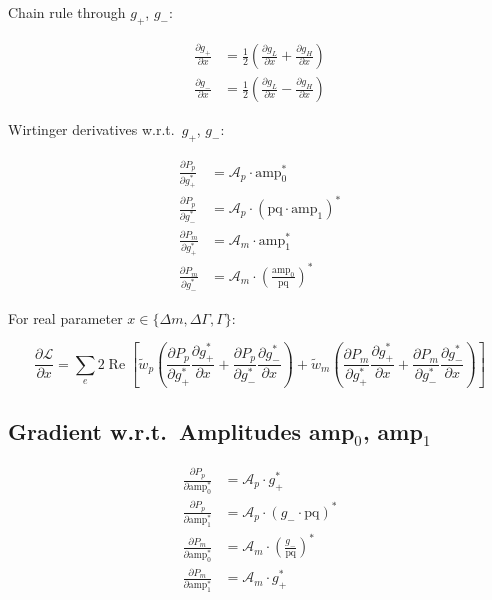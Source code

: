 \documentclass[12pt,a4paper]{article}
\begin{document}
Chain rule through $g_+$, $g_-$:

\begin{align}
\frac{\partial g_+}{\partial x} &= \frac{1}{2}\left(\frac{\partial g_L}{\partial x} + \frac{\partial g_H}{\partial x}\right) \\
\frac{\partial g_-}{\partial x} &= \frac{1}{2}\left(\frac{\partial g_L}{\partial x} - \frac{\partial g_H}{\partial x}\right)
\end{align}

Wirtinger derivatives w.r.t.\ $g_+$, $g_-$:

\begin{align}
\frac{\partial P_p}{\partial g_+^*} &= \mathcal{A}_p \cdot \text{amp}_0^* \\
\frac{\partial P_p}{\partial g_-^*} &= \mathcal{A}_p \cdot (\text{pq} \cdot \text{amp}_1)^* \\
\frac{\partial P_m}{\partial g_+^*} &= \mathcal{A}_m \cdot \text{amp}_1^* \\
\frac{\partial P_m}{\partial g_-^*} &= \mathcal{A}_m \cdot \left(\frac{\text{amp}_0}{\text{pq}}\right)^*
\end{align}

For real parameter $x \in \{\Delta m, \Delta\Gamma, \Gamma\}$:

\begin{equation}
\frac{\partial \mathcal{L}}{\partial x} = \sum_e 2\operatorname{Re}\!\left[
\tilde{w}_p \left(\frac{\partial P_p}{\partial g_+^*} \frac{\partial g_+^*}{\partial x} + \frac{\partial P_p}{\partial g_-^*} \frac{\partial g_-^*}{\partial x}\right)
+ \tilde{w}_m \left(\frac{\partial P_m}{\partial g_+^*} \frac{\partial g_+^*}{\partial x} + \frac{\partial P_m}{\partial g_-^*} \frac{\partial g_-^*}{\partial x}\right)
\right]
\end{equation}

\subsection{Gradient w.r.t.\ Amplitudes amp$_0$, amp$_1$}

\begin{align}
\frac{\partial P_p}{\partial \text{amp}_0^*} &= \mathcal{A}_p \cdot g_+^* \\
\frac{\partial P_p}{\partial \text{amp}_1^*} &= \mathcal{A}_p \cdot (g_- \cdot \text{pq})^* \\
\frac{\partial P_m}{\partial \text{amp}_0^*} &= \mathcal{A}_m \cdot \left(\frac{g_-}{\text{pq}}\right)^* \\
\frac{\partial P_m}{\partial \text{amp}_1^*} &= \mathcal{A}_m \cdot g_+^*
\end{align}
\end{document}
